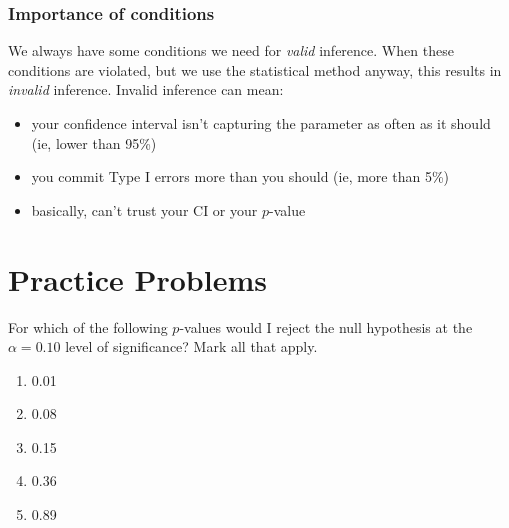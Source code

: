 \begin{frame}
\frametitle{Importance of conditions}
We always have some conditions we need for \emph{valid} inference.  When these conditions are violated, but we use the statistical method anyway, this results in \emph{invalid} inference.  Invalid inference can mean:
\begin{itemize}
    \item
    your confidence interval isn't capturing the parameter as often as it should (ie, lower than 95\%)
    \item
    you commit Type I errors more than you should (ie, more than 5\%)
    \item
    basically, can't trust your CI or your $p$-value
\end{itemize}
\end{frame}

\section[Practice Problems]{Practice Problems}


\begin{frame}
\end{frame}

\begin{frame}
\begin{clicker}{For which of the following $p$-values would I reject the null hypothesis at the $\alpha = 0.10$ level of significance?  Mark all that apply.}
\begin{enumerate}
    \item
    0.01
    \item
    0.08
    \item
    0.15
    \item
    0.36
    \item
    0.89
\end{enumerate}
\end{clicker}
\end{frame}



